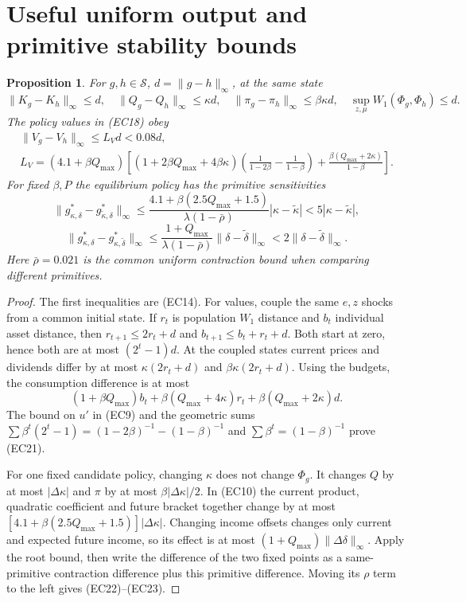 \documentclass[11pt,a4paper]{article}
\newtheorem{proposition}[theorem]{Proposition}
\begin{document}
\section{Useful uniform output and primitive stability bounds}
\begin{proposition}\label{prop:economy-output-stability}
For $g,h\in\mathcal S$, $d=\|g-h\|_\infty$, at the same state
\[
 \|K_g-K_h\|_\infty\leq d,\quad
 \|Q_g-Q_h\|_\infty\leq\kappa d,\quad
 \|\pi_g-\pi_h\|_\infty\leq\beta\kappa d,\quad
 \sup_{z,\mu}W_1(\Phi_g,\Phi_h)\leq d.
 \tag{EC20}
\]
The policy values in \textup{(EC18)} obey
\[
\begin{gathered}
 \|V_g-V_h\|_\infty\leq L_Vd<0.08d,\\
 L_V=(4.1+\beta Q_{\max})
 \left[(1+2\beta Q_{\max}+4\beta\kappa)
 \left(\frac1{1-2\beta}-\frac1{1-\beta}\right)
 +\frac{\beta(Q_{\max}+2\kappa)}{1-\beta}\right].
\end{gathered}
 \tag{EC21}
\]
For fixed $\beta,P$ the equilibrium policy has the primitive sensitivities
\[
 \|g^*_{\kappa,\delta}-g^*_{\tilde\kappa,\delta}\|_\infty
\leq\frac{4.1+\beta(2.5Q_{\max}+1.5)}{\lambda(1-\bar \rho)}
 |\kappa-\tilde\kappa|<5|\kappa-\tilde\kappa|,
 \tag{EC22}
\]
\[
 \|g^*_{\kappa,\delta}-g^*_{\kappa,\tilde\delta}\|_\infty
\leq\frac{1+Q_{\max}}{\lambda(1-\bar \rho)}
 \|\delta-\tilde\delta\|_\infty<2\|\delta-\tilde\delta\|_\infty.
 \tag{EC23}
\]
Here $\bar \rho=0.021$ is the common uniform contraction bound when
comparing different primitives.
\end{proposition}
\begin{proof}
The first inequalities are \textup{(EC14)}. For values, couple the same
$e,z$ shocks from a common initial state. If $r_t$ is population $W_1$
distance and $b_t$ individual asset distance, then
$r_{t+1}\leq2r_t+d$ and $b_{t+1}\leq b_t+r_t+d$.
Both start at zero, hence both are at most $(2^t-1)d$.
At the coupled states current prices and dividends differ by at most
$\kappa(2r_t+d)$ and $\beta\kappa(2r_t+d)$.
Using the budgets, the consumption difference is at most
\[
 (1+\beta Q_{\max})b_t+
 \beta(Q_{\max}+4\kappa)r_t+\beta(Q_{\max}+2\kappa)d.
\]
The bound on $u'$ in \textup{(EC9)} and the geometric sums
$\sum\beta^t(2^t-1)=(1-2\beta)^{-1}-(1-\beta)^{-1}$ and
$\sum\beta^t=(1-\beta)^{-1}$ prove \textup{(EC21)}.

For one fixed candidate policy, changing $\kappa$ does not change
$\Phi_g$. It changes $Q$ by at most $|\Delta\kappa|$ and $\pi$ by
at most $\beta|\Delta\kappa|/2$. In \textup{(EC10)} the current product,
quadratic coefficient and future bracket together change by at most
$[4.1+\beta(2.5Q_{\max}+1.5)]|\Delta\kappa|$.
Changing income offsets changes only current and expected future income,
so its effect is at most $(1+Q_{\max})\|\Delta\delta\|_\infty$.
Apply the root bound, then write the difference of the two fixed points
as a same-primitive contraction difference plus this primitive difference.
Moving its $\rho$ term to the left gives \textup{(EC22)--(EC23)}.
\end{proof}
\end{document}
